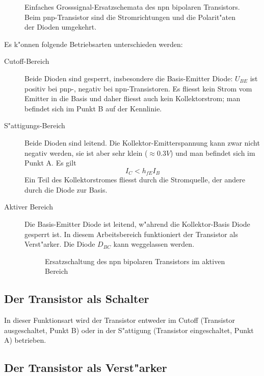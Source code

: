 \documentclass[german, 10pt, a4paper, headsepline]{scrreprt}
\theoremstyle{remark}
\begin{document}
\begin{figure}[hbt]
 
 \centerline{\box\graph}
 \caption{Einfaches Grosssignal-Ersatzschemata des npn bipolaren Transistors. Beim pnp-Transistor sind die Stromrichtungen und die Polarit"aten der Dioden umgekehrt.}
 \label{grosssignal_ersatz}
\end{figure}

Es k"onnen folgende Betriebsarten unterschieden werden:
\begin{description}
	\item[Cutoff-Bereich] Beide Dioden sind gesperrt, insbesondere die Basis-Emitter Diode: $U_{BE}$ ist positiv bei pnp-, negativ bei npn-Transistoren. Es fliesst kein Strom vom Emitter in die Basis und daher fliesst auch kein Kollektorstrom; man befindet sich im Punkt B auf der Kennlinie.
	\item[S"attigungs-Bereich] Beide Dioden sind leitend. Die Kollektor-Emitterspannung kann zwar nicht negativ werden, sie ist aber sehr klein ($\approx 0.3 V$) und man befindet sich im Punkt A. Es gilt
	\begin{displaymath}
		I_C < h_{fE}I_B
	\end{displaymath}
	Ein Teil des Kollektorstromes fliesst durch die Stromquelle, der andere durch die Diode zur Basis.
	\item[Aktiver Bereich] Die Basis-Emitter Diode ist leitend, w"ahrend die Kollektor-Basis Diode gesperrt ist. In diesem Arbeitsbereich funktioniert der Transistor als Ver\-st"arker. Die Diode $D_{BC}$ kann weggelassen werden.
	\begin{figure}[hbt]
	 
	 \centerline{\box\graph}
	 \caption{Ersatzschaltung des npn bipolaren Transistors im aktiven Bereich}
	 \label{grosssignal_ersatz_aktiv}
	\end{figure}	
\end{description}

\subsection{Der Transistor als Schalter}

In dieser Funktionsart wird der Transistor entweder im Cutoff (Transistor ausgeschaltet, Punkt B) oder in der S"attigung (Transistor eingeschaltet, Punkt A) betrieben.

\subsection{Der Transistor als Verst"arker}
\end{document}
